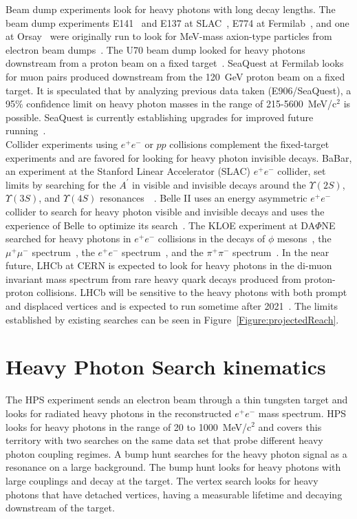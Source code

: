 \indent Beam dump experiments look for heavy photons with long decay lengths. The beam dump experiments E141~\cite{riordan_search_1987} and E137 at SLAC~\cite{bjorken_search_1988}, E774 at Fermilab~\cite{bross_search_1991}, and one at Orsay~\cite{davier_unambiguous_1989}  were originally run to look for MeV-mass axion-type particles from electron beam dumps~\cite{alexander_dark_2016}. The U70 beam dump looked for heavy photons downstream from a proton beam on a fixed target~\cite{Blumlein:2013cua}. SeaQuest at Fermilab looks for muon pairs produced downstream from the 120~GeV proton beam on a fixed target. It is speculated that by analyzing previous data taken (E906/SeaQuest), a 95$\%$ confidence limit on heavy photon masses in the range of 215-5600~MeV/c$^2$ is possible. SeaQuest is currently establishing upgrades for improved future running~\cite{gardner_new_2016}.\\
\indent Collider experiments using $e^+e^-$ or $pp$ collisions complement the fixed-target experiments and are favored for looking for heavy photon invisible decays.  BaBar, an experiment at the Stanford Linear Accelerator (SLAC) $e^+e^-$ collider, set limits by searching for the $A^{\prime}$ in visible and invisible decays around the $\Upsilon(2S)$, $\Upsilon(3S)$, and $\Upsilon(4S)$ resonances~\cite{Lees_2014xha}~\cite{soffer_constraints_2014}. Belle II uses an energy asymmetric $e^+e^-$ collider to search for heavy photon visible and invisible decays and uses the experience of Belle to optimize its search~\cite{Inguglia:2017nxe}. The KLOE experiment at DA$\Phi$NE searched for heavy photons in $e^+e^-$ collisions in the decays of $\phi$ mesons~\cite{collaboration_limit_2013}, the $\mu^+\mu^-$ spectrum~\cite{babusci_search_2014}, the $e^+e^-$ spectrum~\cite{anastasi_limit_2015}, and the $\pi^+\pi^-$ spectrum~\cite{collaboration_limit_2016}. In the near future, LHCb at CERN is expected to look for heavy photons in the di-muon invariant mass spectrum from rare heavy quark decays produced from proton-proton collisions. LHCb will be sensitive to the heavy photons with both prompt and displaced vertices and is expected to run sometime after 2021~\cite{Ilten_2016tkc}. The limits established by existing searches can be seen in Figure~\ref{Figure:projectedReach}.

\section{Heavy Photon Search kinematics}
The HPS experiment sends an electron beam through a thin tungsten target and looks for radiated heavy photons in the reconstructed $e^+e^-$ mass spectrum. HPS looks for heavy photons in the range of 20 to 1000~MeV/c$^2$ and covers this territory with two searches on the same data set that probe different heavy photon coupling regimes. A bump hunt searches for the heavy photon signal as a resonance on a large background. The bump hunt looks for heavy photons with large couplings and decay at the target. The vertex search looks for heavy photons that have detached vertices, having a measurable lifetime and decaying downstream of the target. 

